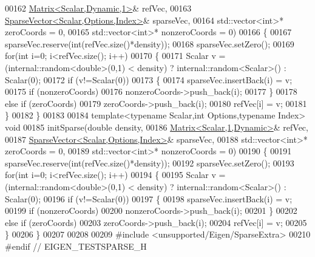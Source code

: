 \begin{DoxyCode}
00162            \hyperlink{group___core___module}{Matrix<Scalar,Dynamic,1>}& refVec,
00163            \hyperlink{group___sparse_core___module_class_eigen_1_1_sparse_vector}{SparseVector<Scalar,Options,Index>}& sparseVec,
00164            std::vector<int>* zeroCoords = 0,
00165            std::vector<int>* nonzeroCoords = 0)
00166 \{
00167   sparseVec.reserve(\textcolor{keywordtype}{int}(refVec.size()*density));
00168   sparseVec.setZero();
00169   \textcolor{keywordflow}{for}(\textcolor{keywordtype}{int} i=0; i<refVec.size(); i++)
00170   \{
00171     Scalar v = (internal::random<double>(0,1) < density) ? internal::random<Scalar>() : Scalar(0);
00172     \textcolor{keywordflow}{if} (v!=Scalar(0))
00173     \{
00174       sparseVec.insertBack(i) = v;
00175       \textcolor{keywordflow}{if} (nonzeroCoords)
00176         nonzeroCoords->push\_back(i);
00177     \}
00178     \textcolor{keywordflow}{else} \textcolor{keywordflow}{if} (zeroCoords)
00179         zeroCoords->push\_back(i);
00180     refVec[i] = v;
00181   \}
00182 \}
00183 
00184 \textcolor{keyword}{template}<\textcolor{keyword}{typename} Scalar,\textcolor{keywordtype}{int} Options,\textcolor{keyword}{typename} Index> \textcolor{keywordtype}{void}
00185 initSparse(\textcolor{keywordtype}{double} density,
00186            \hyperlink{group___core___module_class_eigen_1_1_matrix}{Matrix<Scalar,1,Dynamic>}& refVec,
00187            \hyperlink{group___sparse_core___module_class_eigen_1_1_sparse_vector}{SparseVector<Scalar,Options,Index>}& sparseVec,
00188            std::vector<int>* zeroCoords = 0,
00189            std::vector<int>* nonzeroCoords = 0)
00190 \{
00191   sparseVec.reserve(\textcolor{keywordtype}{int}(refVec.size()*density));
00192   sparseVec.setZero();
00193   \textcolor{keywordflow}{for}(\textcolor{keywordtype}{int} i=0; i<refVec.size(); i++)
00194   \{
00195     Scalar v = (internal::random<double>(0,1) < density) ? internal::random<Scalar>() : Scalar(0);
00196     \textcolor{keywordflow}{if} (v!=Scalar(0))
00197     \{
00198       sparseVec.insertBack(i) = v;
00199       \textcolor{keywordflow}{if} (nonzeroCoords)
00200         nonzeroCoords->push\_back(i);
00201     \}
00202     \textcolor{keywordflow}{else} \textcolor{keywordflow}{if} (zeroCoords)
00203         zeroCoords->push\_back(i);
00204     refVec[i] = v;
00205   \}
00206 \}
00207 
00208 
00209 \textcolor{preprocessor}{#include <unsupported/Eigen/SparseExtra>}
00210 \textcolor{preprocessor}{#endif // EIGEN\_TESTSPARSE\_H}
\end{DoxyCode}
